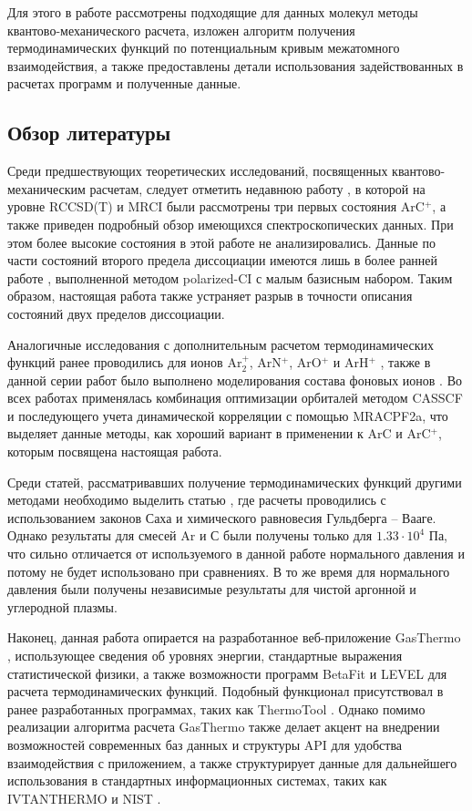 \documentclass[12pt]{extarticle}
\begin{document}
    Для этого в работе рассмотрены подходящие для данных молекул методы квантово-механического расчета, изложен алгоритм получения термодинамических функций по потенциальным кривым межатомного взаимодействия, а также предоставлены детали использования задействованных в расчетах программ и полученные данные.
    
    \subsection{Обзор литературы}
    \label{sec:Chapter0.3}
    
   	Среди предшествующих теоретических исследований, посвященных квантово-механическим расчетам, следует отметить недавнюю работу \cite{tuttle}, в которой на уровне RCCSD(T) и MRCI были рассмотрены три первых состояния ArC$^+$, а также приведен подробный обзор имеющихся спектроскопических данных. При этом более высокие состояния в этой работе не анализировались. Данные по части состояний второго предела диссоциации имеются лишь в более ранней работе \cite{hillier}, выполненной методом polarized-CI с малым базисным набором. Таким образом, настоящая работа также устраняет разрыв в точности описания состояний двух пределов диссоциации.
    	
   	Аналогичные исследования с дополнительным расчетом термодинамических функций ранее проводились для ионов Ar$_2^+$, ArN$^+$, ArO$^+$ и ArH$^+$ \cite{Maltsev_TVT_Ar2_en, Maltsev_ArN_en, Maltsev_TVT_ArO_en, Maltsev_TVT_ArH_en}, также в данной серии работ было выполнено моделирования состава фоновых ионов \cite{Maltsev_gasthermo}. Во всех работах применялась комбинация оптимизации орбиталей методом CASSCF и последующего учета динамической корреляции с помощью MRACPF2a, что выделяет данные методы, как хороший вариант в применении к ArC и ArC$^+$, которым посвящена настоящая работа.
   	
   	Среди статей, рассматривавших получение термодинамических функций другими методами необходимо выделить статью \cite{pousse_thermodynamic_1996}, где расчеты проводились с использованием законов Саха и химического равновесия Гульдберга -- Вааге. Однако результаты для смесей Ar и С были получены только для $1.33 \cdot 10^4$ Па, что сильно отличается от используемого в данной работе нормального давления и потому не будет использовано при сравнениях. В то же время для нормального давления были получены независимые результаты для чистой аргонной и углеродной плазмы.
   	
   	Наконец, данная работа опирается на разработанное веб-приложение GasThermo \cite{gasthermo}, использующее сведения об уровнях энергии, стандартные выражения статистической физики, а также возможности программ BetaFit \cite{le_roy_betafit} и LEVEL \cite{le_roy_level} для расчета термодинамических функций. Подобный функционал присутствовал в ранее разработанных программах, таких как ThermoTool \cite{thermotool}. Однако помимо реализации алгоритма расчета GasThermo также делает акцент на внедрении возможностей современных баз данных и структуры API для удобства взаимодействия с приложением, а также структурирует данные для дальнейшего использования в стандартных информационных системах, таких как IVTANTHERMO \cite{Gurvich,Belov_ivtanthermo} и NIST \cite{Linstrom-2001}.
    
\end{document}
